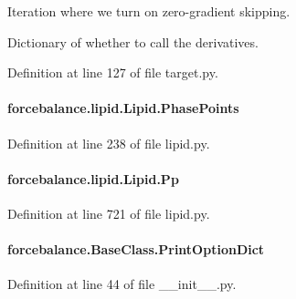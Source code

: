 Iteration where we turn on zero-\/gradient skipping. 

Dictionary of whether to call the derivatives. 

Definition at line 127 of file target.\-py.

\hypertarget{classforcebalance_1_1lipid_1_1Lipid_a06402bf1c90229f6a585c7b97490a358}{
\paragraph[{Phase\-Points}]{\setlength{\rightskip}{0pt plus 5cm}forcebalance.\-lipid.\-Lipid.\-Phase\-Points}}\label{classforcebalance_1_1lipid_1_1Lipid_a06402bf1c90229f6a585c7b97490a358}


Definition at line 238 of file lipid.\-py.

\hypertarget{classforcebalance_1_1lipid_1_1Lipid_aca96d65234d1e76d1fd601579025fe55}{
\paragraph[{Pp}]{\setlength{\rightskip}{0pt plus 5cm}forcebalance.\-lipid.\-Lipid.\-Pp}}\label{classforcebalance_1_1lipid_1_1Lipid_aca96d65234d1e76d1fd601579025fe55}


Definition at line 721 of file lipid.\-py.

\hypertarget{classforcebalance_1_1BaseClass_afc6659278497d7245bc492ecf405ccae}{
\paragraph[{Print\-Option\-Dict}]{\setlength{\rightskip}{0pt plus 5cm}forcebalance.\-Base\-Class.\-Print\-Option\-Dict\hspace{0.3cm}{\ttfamily [inherited]}}}\label{classforcebalance_1_1BaseClass_afc6659278497d7245bc492ecf405ccae}


Definition at line 44 of file \-\_\-\-\_\-init\-\_\-\-\_\-.\-py.

